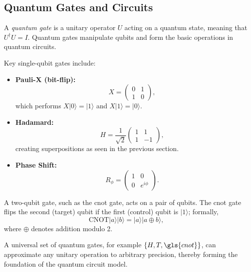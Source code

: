 
\subsection{Quantum Gates and Circuits}
\label{subsec:gates}

\begin{definition}
A \emph{quantum gate} is a unitary operator \(U\) acting on a quantum state, meaning that \(U^\dagger U = I\). Quantum gates manipulate \glspl{qubit} and form the basic operations in quantum circuits.
\end{definition}

\begin{notation}
Key single-qubit gates include:
\begin{itemize}
    \item \textbf{Pauli-X (bit-flip):}
    \[
    X = \begin{pmatrix} 0 & 1 \\ 1 & 0 \end{pmatrix},
    \]
    which performs \(X|0\rangle = |1\rangle\) and \(X|1\rangle = |0\rangle\).
    \item \textbf{Hadamard:}
    \[
    H = \frac{1}{\sqrt{2}}\begin{pmatrix} 1 & 1 \\ 1 & -1 \end{pmatrix},
    \]
    creating superpositions as seen in the previous section.
    \item \textbf{Phase Shift:}
    \[
    R_\phi = \begin{pmatrix} 1 & 0 \\ 0 & e^{i\phi} \end{pmatrix}.
    \]
\end{itemize}
\end{notation}

\begin{definition}
A two-qubit gate, such as the \gls{cnot} gate, acts on a pair of qubits. The \gls{cnot} gate flips the second (target) qubit if the first (control) qubit is \(|1\rangle\); formally,
\[
\text{CNOT}|a\rangle|b\rangle = |a\rangle|a \oplus b\rangle,
\]
where \(\oplus\) denotes addition modulo 2.
\end{definition}

\begin{remark}
A universal set of quantum gates, for example \(\{H, T, \gls{cnot}\}\), can approximate any unitary operation to arbitrary precision, thereby forming the foundation of the quantum circuit model.
\end{remark}

